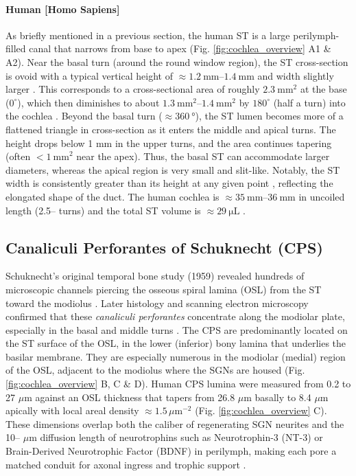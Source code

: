 \documentclass[referee,pdflatex, sn-vancouver-num]{sn-jnl}%
\theoremstyle{thmstyleone}%
\theoremstyle{thmstyletwo}%
\theoremstyle{thmstylethree}%
\newcommand{\um}{\ensuremath{\,\mu\mathrm{m}}}
\DeclareRobustCommand{\textendash}{\ifmmode\text{-}\else\leavevmode\hbox{--}\fi}
\begin{document}
\paragraph{Human [Homo Sapiens]}
As briefly mentioned in a previous section, the human ST is a large perilymph-filled canal that narrows from base to apex (Fig. \ref{fig:cochlea_overview} A1 \& A2). Near the basal turn (around the round window region), the ST cross-section is ovoid with a typical vertical height of $\approx \SIrange{1.2}{1.4}{\mm}$ and width slightly larger \cite{fujiwara2023morphometric}. This corresponds to a cross-sectional area of roughly $\SI{2.3}{\mm^{2}}$ at the base ($0^{\circ}$), which then diminishes to about $\SIrange{1.3}{1.4}{\mm^{2}}$ by $180^{\circ}$ (half a turn) into the cochlea \cite{fujiwara2023morphometric}. Beyond the basal turn ($\approx \SI{360}{\degree}$), the ST lumen becomes more of a flattened triangle in cross-section as it enters the middle and apical turns. The height drops below 1 mm in the upper turns, and the area continues tapering (often $< \SI {1}{\mm}^{2}$ near the apex). Thus, the basal ST can accommodate larger diameters, whereas the apical region is very small and slit-like. Notably, the ST width is consistently greater than its height at any given point \cite{hatsushika1990dimensions}, reflecting the elongated shape of the duct. The human cochlea is $\approx \SIrange{35}{36}{\mm}$ in uncoiled length (2.5\textendash2.7 turns) and the total ST volume is $\approx \SI{29}{\micro\liter}$ \cite{Liu2023FEA}.

\subsection{Canaliculi Perforantes of Schuknecht (CPS)}  
Schuknecht's original temporal bone study (1959) revealed hundreds of microscopic channels piercing the osseous spiral lamina (OSL) from the ST toward the modiolus \cite{Schuknecht1959}. Later histology and scanning electron microscopy confirmed that these \textit{canaliculi perforantes} concentrate along the modiolar plate, especially in the basal and middle turns \cite{schuknecht1963, Schuknecht1959,lim1970, masuda1971,sando1971, tanaka1973, tanaka1976}. The CPS are predominantly located on the ST surface of the OSL, in the lower (inferior) bony lamina that underlies the basilar membrane. They are especially numerous in the modiolar (medial) region of the OSL, adjacent to the modiolus where the SGNs are housed \cite{shepherd2004} (Fig. \ref{fig:cochlea_overview} B, C \& D). Human CPS lumina were measured from 0.2 to 27 $\mu$m against an OSL thickness that tapers from 26.8 $\mu$m basally to 8.4 $\mu$m apically with local areal density $\approx\SI{1.5} \um^{-2}$ \cite{shepherd2004} (Fig. \ref{fig:cochlea_overview} C).  These dimensions overlap both the caliber of regenerating SGN neurites and the 10\textendash30 $\mu$m diffusion length of neurotrophins such as Neurotrophin-3 (NT-3) or Brain-Derived Neurotrophic Factor (BDNF) in perilymph, making each pore a matched conduit for axonal ingress and trophic support \cite{Green2012}.
\end{document}

